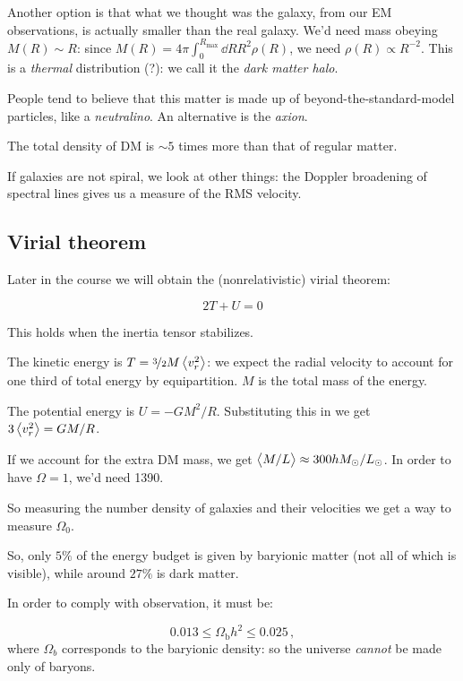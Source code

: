 \documentclass[main.tex]{subfiles}
\begin{document}
Another option is that what we thought was the galaxy, from our EM observations, is actually smaller than the real galaxy. We'd need mass obeying \(M (R) \sim R\): since \(M(R) = 4 \pi \int_0^{R_{\text{max}}} \dd{R} R^2 \rho(R)\), we need \(\rho(R) \propto R^{-2}\). This is a \emph{thermal} distribution (?): we call it the \emph{dark matter halo}.

People tend to believe that this matter is made up of beyond-the-standard-model particles, like a \emph{neutralino}.
An alternative is the \emph{axion}.

The total density of DM is \(\sim 5\) times more than that of regular matter.

If galaxies are not spiral, we look at other things: the Doppler broadening of spectral lines gives us a measure of the RMS velocity.

\subsection{Virial theorem}

Later in the course we will obtain the (nonrelativistic) virial theorem:

\begin{equation}
  2T + U = 0
\end{equation}

This holds when the inertia tensor stabilizes.

The kinetic energy is \(T = \frac[i]{3}{2} M \expval{v_r^2} \): we expect the radial velocity to account for one third of total energy by equipartition.
\(M\) is the total mass of the energy.

The potential energy is \(U = - G M^2 /R\). Substituting this in we get \(3 \expval{v_r^2} = GM/R\).

If we account for the extra DM mass, we get \(\expval{M/L} \approx 300 h M_\odot / L_\odot\).
In order to have \(\Omega = 1\), we'd need 1390.

So measuring the number density of galaxies and their velocities we get a way to measure \(\Omega_0\).

So, only \(5\%\) of the energy budget is given by baryionic matter (not all of which is visible), while around \(27\%\) is dark matter.

In order to comply with observation, it must be:

\begin{equation}
  0.013 \leq \Omega_{\text{b}} h^2 \leq 0.025\,,
\end{equation}
%
where \(\Omega_b\) corresponds to the baryionic density: so the universe \emph{cannot} be made only of baryons.
\end{document}

